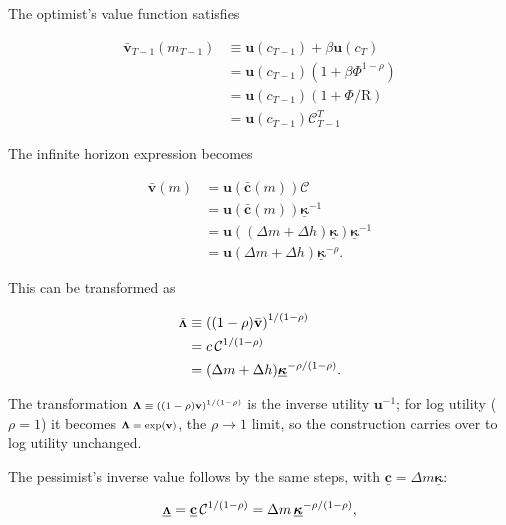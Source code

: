 \documentclass[preprint,authoryear]{elsarticle}
\newcommand{\mNrm}{m}
\newcommand{\cNrm}{c}
\newcommand{\CRRA}{\rho}
\newcommand{\uFunc}{\mathbf{u}}
\newcommand{\DiscFac}{\beta}
\newcommand{\Rfree}{\text{R}}
\newcommand{\vFunc}{\mathbf{v}}
\newcommand{\AbsPatFac}{\Phi}
\newcommand{\hNrm}{h}
\newcommand{\cFunc}{\mathbf{c}}
\newcommand{\cFuncOpt}{\bar{\cFunc}}
\newcommand{\MPC}{\boldsymbol{\kappa}}
\newcommand{\MPCmin}{\underline{\MPC}}
\newcommand{\cFuncPes}{\underline{\cFunc}}
\newcommand{\mNrmEx}{\Delta \mNrm}
\newcommand{\hNrmEx}{\Delta \hNrm}
\newcommand{\vFuncOpt}{\bar{\vFunc}}
\newcommand{\vInv}{{\scriptsize \boldsymbol{\Lambda}}}
\newcommand{\vInvOpt}{\bar{\vInv}}
\newcommand{\PDVCoverc}{\mathcal{C}}
\newcommand{\vInvPes}{\underline{\vInv}}
\begin{document}
The optimist's value function satisfies

\begin{equation}
\begin{aligned}
\vFuncOpt_{T-1}(\mNrm_{T-1}) &\equiv  \uFunc(\cNrm_{T-1})+\DiscFac \uFunc(\cNrm_{T}) \\
&= \uFunc(\cNrm_{T-1})\left(1+\DiscFac \AbsPatFac^{1-\CRRA}\right) \\
&= \uFunc(\cNrm_{T-1})\left(1+\AbsPatFac/\Rfree\right) \\
&= \uFunc(\cNrm_{T-1})\PDVCoverc_{T-1}^{T}
\end{aligned}
\end{equation}

The infinite horizon expression becomes

\begin{equation}
\label{eq:vFuncPF}
\begin{aligned}
\vFuncOpt(\mNrm) &= \uFunc(\cFuncOpt(\mNrm))\PDVCoverc \\
&= \uFunc(\cFuncOpt(\mNrm))\MPCmin^{-1} \\
&= \uFunc((\mNrmEx+\hNrmEx)\MPCmin) \MPCmin^{-1} \\
&= \uFunc(\mNrmEx+\hNrmEx)\MPCmin^{-\CRRA}.
\end{aligned}
\end{equation}

This can be transformed as

\begin{equation}
\begin{aligned}
\vInvOpt &\equiv  \left((1-\CRRA)\vFuncOpt\right)^{1/(1-\CRRA)}   \\
&= \cNrm\,\PDVCoverc^{1/(1-\CRRA)} \\
&= (\mNrmEx+\hNrmEx)\MPCmin^{-\CRRA/(1-\CRRA)}.
\end{aligned}
\end{equation}

The transformation $\vInv \equiv \left((1 -\CRRA)\vFunc\right)^{1/(1 -\CRRA)}$ is the inverse utility $\uFunc^{ -1}$; for log utility ($\CRRA=1$) it becomes $\vInv = \exp(\vFunc)$, the $\CRRA\to1$ limit, so the construction carries over to log utility unchanged.

The pessimist's inverse value follows by the same steps, with $\cFuncPes = \mNrmEx\MPCmin$:

\begin{equation}
\vInvPes = \cFuncPes\,\PDVCoverc^{1/(1-\CRRA)} = \mNrmEx\,\MPCmin^{-\CRRA/(1-\CRRA)},
\end{equation}
\end{document}
